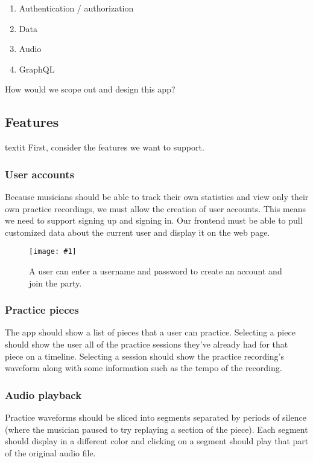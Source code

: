 \documentclass{article}
\newcommand{\screenshot}[2]{
  \begin{figure}[h]
    \texttt{[image: \#1]}
    \caption*{#2}
  \end{figure}
}
\begin{document}
\begin{enumerate}
  \item Authentication / authorization
  \item Data
  \item Audio
  \item GraphQL
\end{enumerate}

How would we scope out and design this app?

\subsection{Features}
textit
First, consider the features we want to support.

\subsubsection{User accounts}

Because musicians should be able to track their own statistics and view only their own practice recordings, we must allow the creation of user accounts.
This means we need to support signing up and signing in.
Our frontend must be able to pull customized data about the current user and display it on the web page.

\screenshot{jong-signup}{A user can enter a username and password to create an account and join the party.}

\subsubsection{Practice pieces}

The app should show a list of pieces that a user can practice.
Selecting a piece should show the user all of the practice sessions they've already had for that piece on a timeline.
Selecting a session should show the practice recording's waveform along with some information such as the tempo of the recording.

\subsubsection{Audio playback}

Practice waveforms should be sliced into segments separated by periods of silence (where the musician paused to try replaying a section of the piece).
Each segment should display in a different color and clicking on a segment should play that part of the original audio file.
\end{document}
